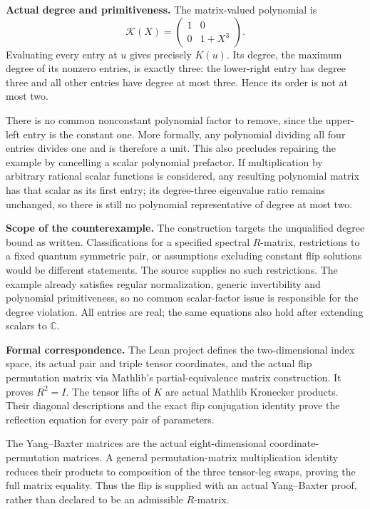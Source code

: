 \documentclass[11pt]{article}
\begin{document}
\newpage
\noindent\textbf{Actual degree and primitiveness.}
The matrix-valued polynomial is
\[
 \mathcal K(X)=\begin{pmatrix}1&0\\0&1+X^3\end{pmatrix}.
\]
Evaluating every entry at $u$ gives precisely $K(u)$.
Its degree, the maximum degree of its nonzero entries, is exactly three:
the lower-right entry has degree three and all other entries have degree at most three. Hence its order is not at most two.

There is no common nonconstant polynomial factor to remove, since the upper-left entry is the constant one. More formally, any polynomial dividing all four entries divides one and is therefore a unit. This also precludes repairing the example by cancelling a scalar polynomial prefactor. If multiplication by arbitrary rational scalar functions is considered, any resulting polynomial matrix has that scalar as its first entry; its degree-three eigenvalue ratio remains unchanged, so there is still no polynomial representative of degree at most two.

\medskip
\noindent\textbf{Scope of the counterexample.}
The construction targets the unqualified degree bound as written. Classifications for a specified spectral $R$-matrix, restrictions to a fixed quantum symmetric pair, or assumptions excluding constant flip solutions would be different statements. The source supplies no such restrictions. The example already satisfies regular normalization, generic invertibility and polynomial primitiveness, so no common scalar-factor issue is responsible for the degree violation. All entries are real; the same equations also hold after extending scalars to $\mathbb C$.

\medskip
\noindent\textbf{Formal correspondence.}
The Lean project defines the two-dimensional index space, its actual pair and triple tensor coordinates, and the actual flip permutation matrix via Mathlib's partial-equivalence matrix construction. It proves $R^2=I$. The tensor lifts of $K$ are actual Mathlib Kronecker products. Their diagonal descriptions and the exact flip conjugation identity prove the reflection equation for every pair of parameters.

The Yang--Baxter matrices are the actual eight-dimensional coordinate-permutation matrices. A general permutation-matrix multiplication identity reduces their products to composition of the three tensor-leg swaps, proving the full matrix equality. Thus the flip is supplied with an actual Yang--Baxter proof, rather than declared to be an admissible $R$-matrix.
\end{document}
